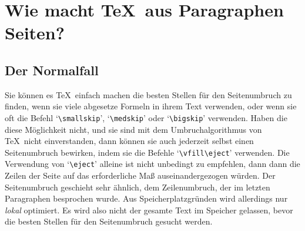 \section{Wie macht \TeX\ aus Paragraphen Seiten?}
\subsection{Der Normalfall}
Sie k\"onnen es \TeX\ einfach machen die besten Stellen f\"ur den
Seitenumbruch zu finden, wenn sie viele abgesetze Formeln in ihrem
Text verwenden, oder wenn sie oft die Befehl
`\verb|\smallskip|',
`\verb|\medskip|' oder 
`\verb|\bigskip|' verwenden. Haben die diese
M\"oglichkeit nicht, und sie sind mit dem Umbruchalgorithmus von \TeX\
nicht einverstanden, dann k\"onnen sie auch jederzeit selbst einen
Seitenumbruch bewirken, indem sie die Befehle
`\verb|\vfill\eject|'
verwenden. Die Verwendung von `\verb|\eject|' alleine ist nicht
unbedingt zu empfehlen, dann dann die Zeilen der Seite auf das
erforderliche Ma\ss{} auseinandergezogen w\"urden. Der Seitenumbruch
geschieht sehr \"ahnlich, dem Zeilenumbruch, der im letzten Paragraphen
besprochen wurde. Aus \index{Speicher!Platz}
Speicherplatzgr\"unden wird allerdings nur {\em
lokal} optimiert. Es wird also nicht der gesamte Text im Speicher
gelassen, bevor die besten Stellen f\"ur den Seitenumbruch gesucht
werden.
